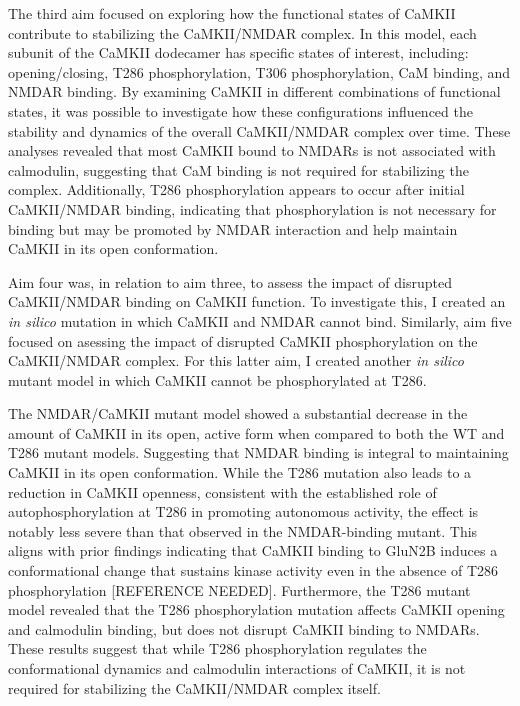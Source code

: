 \documentclass[
  11pt,
  letterpaper,
]{scrreprt}
\begin{document}
The third aim focused on exploring how the functional states of CaMKII
contribute to stabilizing the CaMKII/NMDAR complex. In this model, each
subunit of the CaMKII dodecamer has specific states of interest,
including: opening/closing, T286 phosphorylation, T306 phosphorylation,
CaM binding, and NMDAR binding. By examining CaMKII in different
combinations of functional states, it was possible to investigate how
these configurations influenced the stability and dynamics of the
overall CaMKII/NMDAR complex over time. These analyses revealed that
most CaMKII bound to NMDARs is not associated with calmodulin,
suggesting that CaM binding is not required for stabilizing the complex.
Additionally, T286 phosphorylation appears to occur after initial
CaMKII/NMDAR binding, indicating that phosphorylation is not necessary
for binding but may be promoted by NMDAR interaction and help maintain
CaMKII in its open conformation.

Aim four was, in relation to aim three, to assess the impact of
disrupted CaMKII/NMDAR binding on CaMKII function. To investigate this,
I created an \emph{in silico} mutation in which CaMKII and NMDAR cannot
bind. Similarly, aim five focused on asessing the impact of disrupted
CaMKII phosphorylation on the CaMKII/NMDAR complex. For this latter aim,
I created another \emph{in silico} mutant model in which CaMKII cannot
be phosphorylated at T286.

The NMDAR/CaMKII mutant model showed a substantial decrease in the
amount of CaMKII in its open, active form when compared to both the WT
and T286 mutant models. Suggesting that NMDAR binding is integral to
maintaining CaMKII in its open conformation. While the T286 mutation
also leads to a reduction in CaMKII openness, consistent with the
established role of autophosphorylation at T286 in promoting autonomous
activity, the effect is notably less severe than that observed in the
NMDAR-binding mutant. This aligns with prior findings indicating that
CaMKII binding to GluN2B induces a conformational change that sustains
kinase activity even in the absence of T286 phosphorylation {[}REFERENCE
NEEDED{]}. Furthermore, the T286 mutant model revealed that the T286
phosphorylation mutation affects CaMKII opening and calmodulin binding,
but does not disrupt CaMKII binding to NMDARs. These results suggest
that while T286 phosphorylation regulates the conformational dynamics
and calmodulin interactions of CaMKII, it is not required for
stabilizing the CaMKII/NMDAR complex itself.
\end{document}
